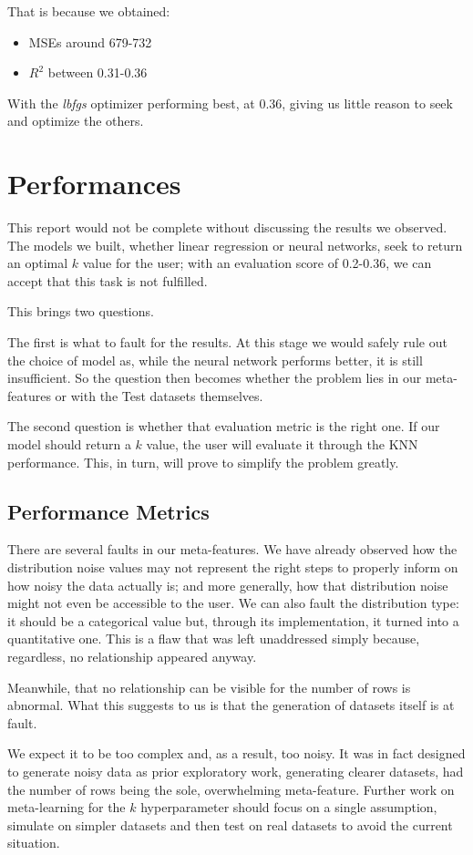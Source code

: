 \documentclass[a4paper,11pt]{article}
\begin{document}
That is because we obtained:
\begin{itemize}
    \item MSEs around 679-732
    \item \(R^2\) between 0.31-0.36
\end{itemize}
With the \textit{lbfgs} optimizer performing best, at 0.36, giving us little reason to seek and optimize the others.

\section{Performances}
This report would not be complete without discussing the results we observed. The models we built, whether linear regression or neural networks, seek to return an optimal \(k\) value for the user; with an evaluation score of 0.2-0.36, we can accept that this task is not fulfilled.

This brings two questions. 

The first is what to fault for the results. At this stage we would safely rule out the choice of model as, while the neural network performs better, it is still insufficient. So the question then becomes whether the problem lies in our meta-features or with the Test datasets themselves. 

The second question is whether that evaluation metric is the right one. If our model should return a \(k\) value, the user will evaluate it through the KNN performance. This, in turn, will prove to simplify the problem greatly.

\subsection{Performance Metrics}
There are several faults in our meta-features. We have already observed how the distribution noise values may not represent the right steps to properly inform on how noisy the data actually is; and more generally, how that distribution noise might not even be accessible to the user. We can also fault the distribution type: it should be a categorical value but, through its implementation, it turned into a quantitative one. This is a flaw that was left unaddressed simply because, regardless, no relationship appeared anyway.

Meanwhile, that no relationship can be visible for the number of rows is abnormal. What this suggests to us is that the generation of datasets itself is at fault. 

We expect it to be too complex and, as a result, too noisy. It was in fact designed to generate noisy data as prior exploratory work, generating clearer datasets, had the number of rows being the sole, overwhelming meta-feature. Further work on meta-learning for the \(k\) hyperparameter should focus on a single assumption, simulate on simpler datasets and then test on real datasets to avoid the current situation. 
\end{document}
